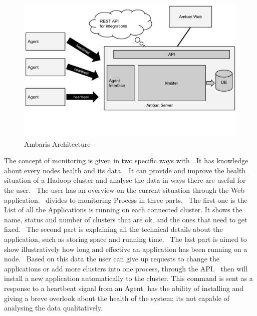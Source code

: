 \begin{figure}
  \centering
  \includegraphics[width=\linewidth,clip=true,trim=0 3cm 0 0]{images/AmbariArchitecture}
  \caption{Ambaris Architecture~\cite{Sako, Sako2013}}
  \label{fig:AmbariArchitecture}
\end{figure}

The concept of monitoring is given in two specific ways with \amb. 
It has knowledge about every nodes health and its data.~\cite{Foley2012} 
It can provide and improve the health situation of a Hadoop cluster and analyse the data in ways there are useful for the user.~\cite{Foley2012} 
The user has an overview on the current situation through the Web application.~\cite{Foley2012} 
\amb divides to monitoring Process in three parts.~\cite{Foley2012} 
The first one is the List of all the Applications \amb is running on each connected cluster. 
It shows the name, status and number of clusters that are ok, and the ones that need to get fixed.~\cite{Foley2012} 
The second part is explaining all the technical details about the application, such as storing space and running time.~\cite{Foley2012} 
The last part is aimed to show illustratively how long and effective an application has been running on a node.~\cite{Foley2012} 
Based on this data the user can give up requests to change the applications or add more clusters into one process, through the API.~\cite{Sako} 
\amb then will install a new application automatically to the cluster. This command is sent as a response to a heartbeat signal from an \amb Agent. \cite{Sako} 
\amb has the ability of installing and giving a breve overlook about the health of the system; its not capable of analysing the data qualitatively.\cite{Sako}


